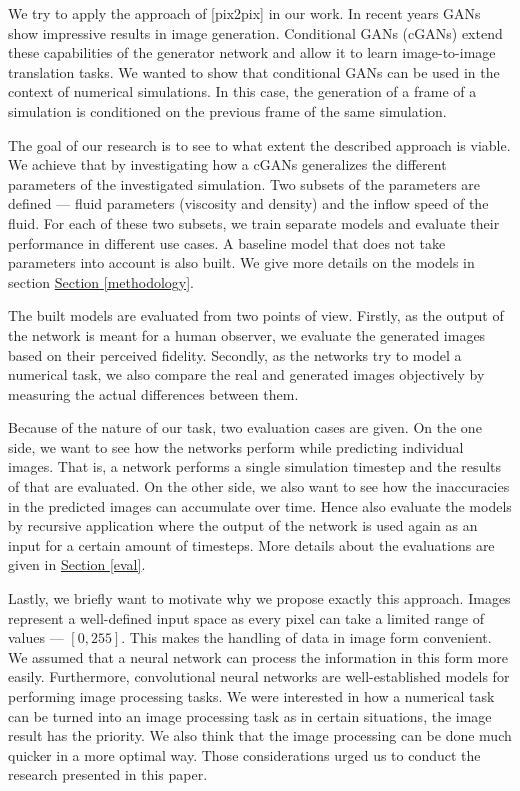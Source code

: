\documentclass{llncs}
\newcommand{\refsec}[1]{\hyperref[#1]{Section \ref*{#1}}}
\begin{document}
We try to apply the approach of [pix2pix] in our work. In recent years GANs show impressive results in image generation. Conditional GANs (cGANs) extend these capabilities of the generator network and allow it to learn image-to-image translation tasks. We wanted to show that conditional GANs can be used in the context of numerical simulations. In this case, the generation of a frame of a simulation is conditioned on the previous frame of the same simulation.

The goal of our research is to see to what extent the described approach is viable. We achieve that by investigating how a cGANs generalizes the different parameters of the investigated simulation. Two subsets of the parameters are defined --- fluid parameters (viscosity and density) and the inflow speed of the fluid. For each of these two subsets, we train separate models and evaluate their performance in different use cases. A baseline model that does not take parameters into account is also built. We give more details on the models in section \refsec{methodology}.

The built models are evaluated from two points of view. Firstly, as the output of the network is meant for a human observer, we evaluate the generated images based on their perceived fidelity. Secondly, as the networks try to model a numerical task, we also compare the real and generated images objectively by measuring the actual differences between them.

Because of the nature of our task, two evaluation cases are given. On the one side, we want to see how the networks perform while predicting individual images. That is, a network performs a single simulation timestep and the results of that are evaluated. On the other side, we also want to see how the inaccuracies in the predicted images can accumulate over time. Hence also evaluate the models by recursive application where the output of the network is used again as an input for a certain amount of timesteps. More details about the evaluations are given in \refsec{eval}.

Lastly, we briefly want to motivate why we propose exactly this approach. Images represent a well-defined input space as every pixel can take a limited range of values --- $[0, 255]$. This makes the handling of data in image form convenient. We assumed that a neural network can process the information in this form more easily. Furthermore, convolutional neural networks are well-established models for performing image processing tasks. We were interested in how a numerical task can be turned into an image processing task as in certain situations, the image result has the priority. We also think that the image processing can be done much quicker in a more optimal way. Those considerations urged us to conduct the research presented in this paper.
\end{document}
